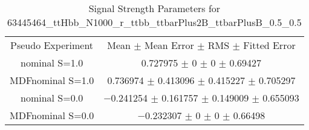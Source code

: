 \begin{table}
\centering
\caption{Signal Strength Parameters for 63445464\_ttHbb\_N1000\_r\_ttbb\_ttbarPlus2B\_ttbarPlusB\_0.5\_0.5}
\begin{tabular}{cc}
\toprule
Pseudo Experiment & Mean $\pm$ Mean Error $\pm$ RMS $\pm$ Fitted Error\\
nominal S=1.0 & \num{0.727975} $\pm$ \num{0} $\pm$ \num{0} $\pm$ \num{0.69427}\\
MDFnominal S=1.0 & \num{0.736974} $\pm$ \num{0.413096} $\pm$ \num{0.415227} $\pm$ \num{0.705297}\\
nominal S=0.0 & \num{-0.241254} $\pm$ \num{0.161757} $\pm$ \num{0.149009} $\pm$ \num{0.655093}\\
MDFnominal S=0.0 & \num{-0.232307} $\pm$ \num{0} $\pm$ \num{0} $\pm$ \num{0.66498}\\
\bottomrule
\end{tabular}
\end{table}